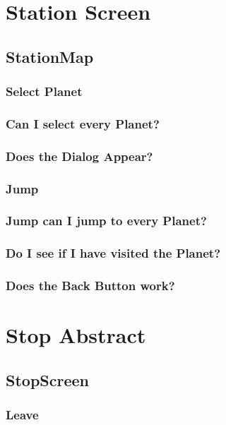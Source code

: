 \documentclass[11pt]{article}
\begin{document}
\section{Station Screen}
\label{sec:orga891bce}

\subsection{StationMap}

\subsubsection{Select Planet}

\subsubsection{Can I select every Planet?}
\subsubsection{Does the Dialog Appear?}
\subsubsection{ Jump}
\subsubsection{Jump can I jump to every Planet?}
\subsubsection{Do I see if I have visited the Planet?}
\subsubsection{ Does the Back Button work?}


\section{Stop Abstract}
\label{sec:org3bde3ec}

\subsection{StopScreen}

\subsubsection{Leave}
\end{document}
